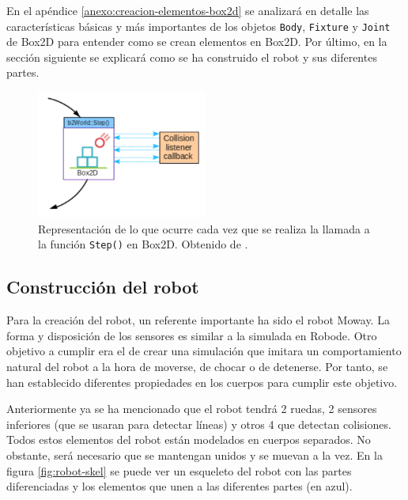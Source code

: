 En el apéndice \ref{anexo:creacion-elementos-box2d} se analizará en detalle las características básicas y más importantes de los objetos \texttt{Body}, \texttt{Fixture} y \texttt{Joint} de Box2D para entender como se crean elementos en Box2D. Por último, en la sección siguiente se explicará como se ha construido el robot y sus diferentes partes.


\begin{figure}[!ht]
	\begin{centering}
		\includegraphics[width=0.5\textwidth]{images/step-box2d.png}
			\caption{Representación de lo que ocurre cada vez que se realiza la llamada a la función \texttt{Step()} en Box2D. Obtenido de \cite{box2d}.}
				\label{fig:step-box2d}
	\end{centering}
\end{figure}


\subsection{Construcción del robot}
\label{sec:contruccion-robot}

Para la creación del robot, un referente importante ha sido el robot Moway. La forma y disposición de los sensores es similar a la simulada en Robode. Otro objetivo a cumplir era el de crear una simulación que imitara un comportamiento natural del robot a la hora de moverse, de chocar o de detenerse. Por tanto, se han establecido diferentes propiedades en los cuerpos para cumplir este objetivo.

Anteriormente ya se ha mencionado que el robot tendrá 2 ruedas, 2 sensores inferiores (que se usaran para detectar líneas) y otros 4 que detectan colisiones. Todos estos elementos del robot están modelados en cuerpos separados. No obstante, será necesario que se mantengan unidos y se muevan a la vez. En la figura \ref{fig:robot-skel} se puede ver un esqueleto del robot con las partes diferenciadas y los elementos que unen a las diferentes partes (en azul).

